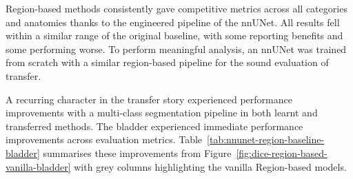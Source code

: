 \documentclass[11pt,twoside]{report}
\begin{document}

Region-based methods consistently gave competitive metrics across all categories and anatomies thanks to the engineered pipeline of the nnUNet. All results fell within a similar range of the original baseline, with some reporting benefits and some performing worse. To perform meaningful analysis, an nnUNet was trained from scratch with a similar region-based pipeline for the sound evaluation of transfer.

A recurring character in the transfer story experienced performance improvements with a multi-class segmentation pipeline in both learnt and transferred methods. The bladder experienced immediate performance improvements across evaluation metrics. Table~\ref{tab:nnunet-region-baseline-bladder} summarises these improvements from Figure~\ref{fig:dice-region-based-vanilla-bladder} with grey columns highlighting the vanilla Region-based models.
\end{document}
